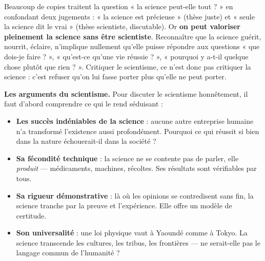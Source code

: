 \documentclass[11pt]{article}
\begin{document}
\begin{attention}
Beaucoup de copies traitent la question « la science peut-elle tout ? » en confondant deux jugements : « la science est précieuse » (thèse juste) et « seule la science dit le vrai » (thèse scientiste, discutable). Or \textbf{on peut valoriser pleinement la science sans être scientiste}. Reconnaître que la science guérit, nourrit, éclaire, n'implique nullement qu'elle puisse répondre aux questions « que dois-je faire ? », « qu'est-ce qu'une vie réussie ? », « pourquoi y a-t-il quelque chose plutôt que rien ? ». Critiquer le scientisme, ce n'est donc pas critiquer la science : c'est refuser qu'on lui fasse porter plus qu'elle ne peut porter.
\end{attention}

\textbf{Les arguments du scientisme.} Pour discuter le scientisme honnêtement, il faut d'abord comprendre ce qui le rend séduisant :

\begin{itemize}
\item \textbf{Les succès indéniables de la science} : aucune autre entreprise humaine n'a transformé l'existence aussi profondément. Pourquoi ce qui réussit si bien dans la nature échouerait-il dans la société ?
\item \textbf{Sa fécondité technique} : la science ne se contente pas de parler, elle \emph{produit} — médicaments, machines, récoltes. Ses résultats sont vérifiables par tous.
\item \textbf{Sa rigueur démonstrative} : là où les opinions se contredisent sans fin, la science tranche par la preuve et l'expérience. Elle offre un modèle de certitude.
\item \textbf{Son universalité} : une loi physique vaut à Yaoundé comme à Tokyo. La science transcende les cultures, les tribus, les frontières — ne serait-elle pas le langage commun de l'humanité ?
\end{itemize}
\end{document}
